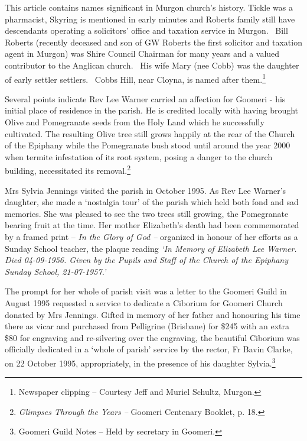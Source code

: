 This article contains names significant in Murgon church's history. Tickle was a pharmacist, Skyring is mentioned in early minutes and Roberts family still have descendants operating a solicitors' office and taxation service in Murgon.~ Bill Roberts (recently deceased and son of GW Roberts the first solicitor and taxation agent in Murgon) was Shire Council Chairman for many years and a valued contributor to the Anglican church.~ His wife Mary (nee Cobb) was the daughter of early settler settlers.~ Cobbs Hill, near Cloyna, is named after them.\footnote{Newspaper clipping -- Courtesy Jeff and Muriel Schultz, Murgon.}


Several points indicate Rev Lee Warner carried an affection for Goomeri - his initial place of residence in the parish. He is credited locally with having brought Olive and Pomegranate seeds from the Holy Land which he successfully cultivated. The resulting Olive tree still grows happily at the rear of the Church of the Epiphany while the Pomegranate bush stood until around the year 2000 when termite infestation of its root system, posing a danger to the church building, necessitated its removal.\footnote{\emph{Glimpses Through the Years --} Goomeri Centenary Booklet, p. 18.}


Mrs Sylvia Jennings visited the parish in October 1995. As Rev Lee Warner's daughter, she made a `nostalgia tour' of the parish which held both fond and sad memories. She was pleased to see the two trees still growing, the Pomegranate bearing fruit at the time. Her mother Elizabeth's death had been commemorated by a framed print -- \emph{In the Glory of God --} organized in honour of her efforts as a Sunday School teacher, the plaque reading \emph{`In Memory of Elizabeth Lee Warner. Died 04-09-1956. Given by the Pupils and Staff of the Church of the Epiphany Sunday School, 21-07-1957.'}



The prompt for her whole of parish visit was a letter to the Goomeri Guild in August 1995 requested a service to dedicate a Ciborium for Goomeri Church donated by Mrs Jennings. Gifted in memory of her father and honouring his time there as vicar and purchased from Pelligrine (Brisbane) for \$245 with an extra \$80 for engraving and re-silvering over the engraving, the beautiful Ciborium was officially dedicated in a `whole of parish' service by the rector, Fr Bavin Clarke, on 22 October 1995, appropriately, in the presence of his daughter Sylvia.\footnote{Goomeri Guild Notes -- Held by secretary in Goomeri.}


